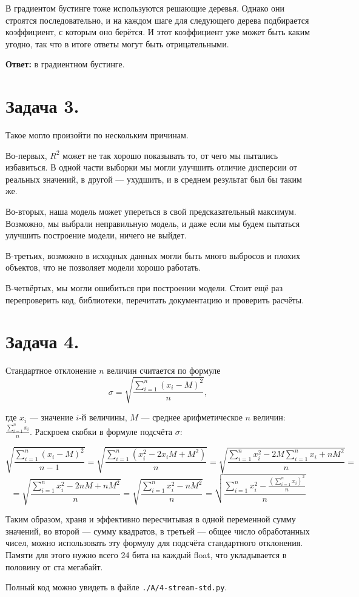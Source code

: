 \documentclass[a4paper, 12pt]{article}
\renewcommand{\l}{\left(}
\renewcommand{\r}{\right)}
\newcommand{\z}[1]{\section*{Задача #1.}}
\begin{document}
В градиентом бустинге тоже используются решающие деревья. Однако они строятся последовательно, и на каждом шаге для следующего дерева подбирается коэффициент, с которым оно берётся. И этот коэффициент уже может быть каким угодно, так что в итоге ответы могут быть отрицательными.

\textbf{Ответ:} в градиентном бустинге.


\z 3

Такое могло произойти по нескольким причинам.

Во-первых, $R^2$ может не так хорошо показывать то, от чего мы пытались избавиться. В одной части выборки мы могли улучшить отличие дисперсии от реальных значений, в другой --- ухудшить, и в среднем результат был бы таким же.

Во-вторых, наша модель может упереться в свой предсказательный максимум. Возможно, мы выбрали неправильную модель, и даже если мы будем пытаться улучшить построение модели, ничего не выйдет.

В-третьих, возможно в исходных данных могли быть много выбросов и плохих объектов, что не позволяет модели хорошо работать.

В-четвёртых, мы могли ошибиться при построении модели. Стоит ещё раз перепроверить код, библиотеки, перечитать документацию и проверить расчёты.

\z 4

Стандартное отклонение $n$ величин считается по формуле $$\sigma = \sqrt{\frac{\sum_{i=1}^n \l x_i - M\r^2}{n} },$$

где $x_i$ --- значение $i$-й величины, $M$ --- среднее арифметическое $n$ величин: $\frac{\sum_{i=1}^n x_i}{n}$. Раскроем скобки в формуле подсчёта $\sigma$: 

$$\sqrt{\frac{\sum_{i=1}^n \l x_i - M\r^2}{n-1} } = \sqrt{\frac{\sum_{i=1}^n \l x_i^2 - 2x_iM + M^2\r}{n} } = \sqrt{\frac{ \sum_{i=1}^n x_i^2 - 2M \sum_{i=1}^n x_i + nM^2 }{n}} =$$ $$=\sqrt{\frac{ \sum_{i=1}^n x_i^2 - 2nM  + nM^2 }{n}} = \sqrt{\frac{ \sum_{i=1}^n x_i^2 -nM^2 }{n}} = \sqrt{\frac{ \sum_{i=1}^n x_i^2 -  \frac{ \l \sum_{i=1}^n x_i\r^2}{n}}{n}}$$

Таким образом, храня и эффективно пересчитывая в одной переменной сумму значений, во второй --- сумму квадратов, в третьей --- общее число обработанных чисел, можно использовать эту формулу для подсчёта стандартного отклонения. Памяти для этого нужно всего 24 бита на каждый float, что укладывается в половину от ста мегабайт.

Полный код можно увидеть в файле \texttt{./A/4-stream-std.py}.
\end{document}
